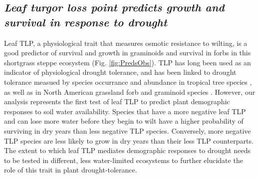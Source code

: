 \documentclass[12pt, letterpaper]{article}
\begin{document}
\subsection{\textit{Leaf turgor loss point predicts growth and survival in response to drought}} Leaf TLP, a physiological trait that measures osmotic resistance to wilting, is a good predictor of survival and growth in graminoids and survival in forbs in this shortgrass steppe ecosystem (Fig. \ref{fig:PredsObs}). TLP has long been used as an indicator of physiological drought tolerance, and has been linked to drought tolerance measued by species occurrance and abundance in  tropical tree species \citep{Bartlett2012}, as well as in North American grassland forb and graminoid species \citep{Griffin-Nolan2019, Blumenthal2020, Wilcox2020PlantPrairie}. However, our analysis represents the first test of leaf TLP to predict plant demographic responses to soil water availability. Species that have a more negative leaf TLP and can lose more water before they begin to wilt have a higher probability  of surviving in dry years than less negative TLP species. Conversely, more negative TLP species are less likely to grow in dry years than their less TLP counterparts. The extent to which leaf TLP mediates demographic responses to drought needs to be tested in different, less water-limited ecosystems to further elucidate the role of this trait in plant drought-tolerance.   
\end{document}
